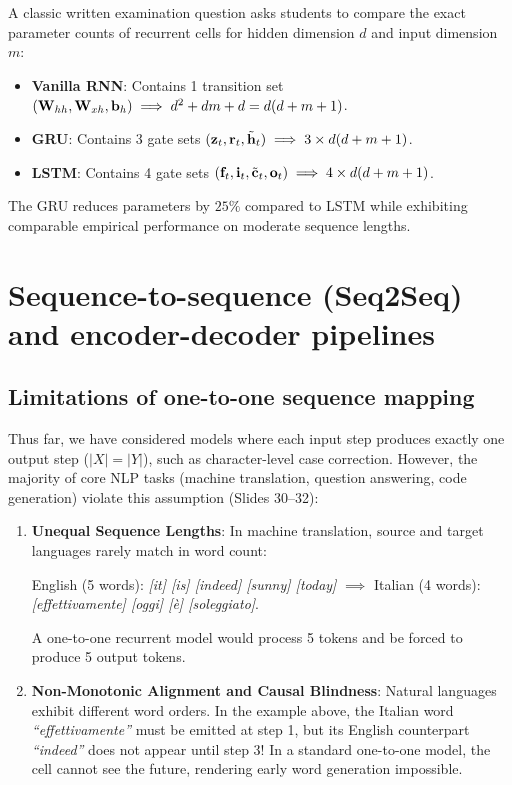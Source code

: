 \documentclass[../../main.tex]{subfiles}
\begin{document}
\begin{examinsight}
A classic written examination question asks students to compare the exact parameter counts of recurrent cells for hidden dimension $d$ and input dimension $m$:
\begin{itemize}
    \item \textbf{Vanilla RNN}: Contains 1 transition set $(\mathbf{W}_{hh}, \mathbf{W}_{xh}, \mathbf{b}_h) \implies d^2 + dm + d = d(d + m + 1)$.
    \item \textbf{GRU}: Contains 3 gate sets $(\mathbf{z}_t, \mathbf{r}_t, \tilde{\mathbf{h}}_t) \implies 3 \times d(d + m + 1)$.
    \item \textbf{LSTM}: Contains 4 gate sets $(\mathbf{f}_t, \mathbf{i}_t, \tilde{\mathbf{c}}_t, \mathbf{o}_t) \implies 4 \times d(d + m + 1)$.
\end{itemize}
The GRU reduces parameters by $25\%$ compared to LSTM while exhibiting comparable empirical performance on moderate sequence lengths.
\end{examinsight}

\section{Sequence-to-sequence (Seq2Seq) and encoder-decoder pipelines}
\label{sec:seq2seq}

\subsection{Limitations of one-to-one sequence mapping}
Thus far, we have considered models where each input step produces exactly one output step ($|X| = |Y|$), such as character-level case correction. However, the majority of core NLP tasks (machine translation, question answering, code generation) violate this assumption (Slides 30--32):
\begin{enumerate}
    \item \textbf{Unequal Sequence Lengths}: In machine translation, source and target languages rarely match in word count:
    \begin{center}
    English (5 words): \textit{[it] [is] [indeed] [sunny] [today]} $\implies$ Italian (4 words): \textit{[effettivamente] [oggi] [è] [soleggiato]}.
    \end{center}
    A one-to-one recurrent model would process 5 tokens and be forced to produce 5 output tokens.
    \item \textbf{Non-Monotonic Alignment and Causal Blindness}: Natural languages exhibit different word orders. In the example above, the Italian word \textit{``effettivamente''} must be emitted at step 1, but its English counterpart \textit{``indeed''} does not appear until step 3! In a standard one-to-one model, the cell cannot see the future, rendering early word generation impossible.
\end{enumerate}
\end{document}
